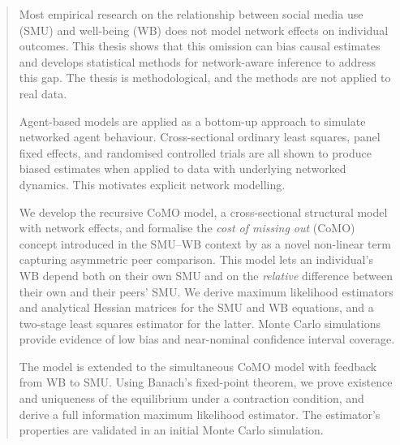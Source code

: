 

\begin{abstract}

Most empirical research on the relationship between social media use (SMU) and well-being (WB) does not model network effects on individual outcomes. This thesis shows that this omission can bias causal estimates and develops statistical methods for network-aware inference to address this gap. The thesis is methodological, and the methods are not applied to real data.

Agent-based models are applied as a bottom-up approach to simulate networked agent behaviour. Cross-sectional ordinary least squares, panel fixed effects, and randomised controlled trials are all shown to produce biased estimates when applied to data with underlying networked dynamics. This motivates explicit network modelling.

We develop the recursive CoMO model, a cross-sectional structural model with network effects, and formalise the \emph{cost of missing out} (CoMO) concept introduced in the SMU--WB context by \textcite{DahlFoldnesGronneberg2024} as a novel non-linear term capturing asymmetric peer comparison. This model lets an individual's WB depend both on their own SMU and on the \emph{relative} difference between their own and their peers' SMU\@. We derive maximum likelihood estimators and analytical Hessian matrices for the SMU and WB equations, and a two-stage least squares estimator for the latter. Monte Carlo simulations provide evidence of low bias and near-nominal confidence interval coverage.

The model is extended to the simultaneous CoMO model with feedback from WB to SMU\@. Using Banach's fixed-point theorem, we prove existence and uniqueness of the equilibrium under a contraction condition, and derive a full information maximum likelihood estimator. The estimator's properties are validated in an initial Monte Carlo simulation.

\end{abstract}
